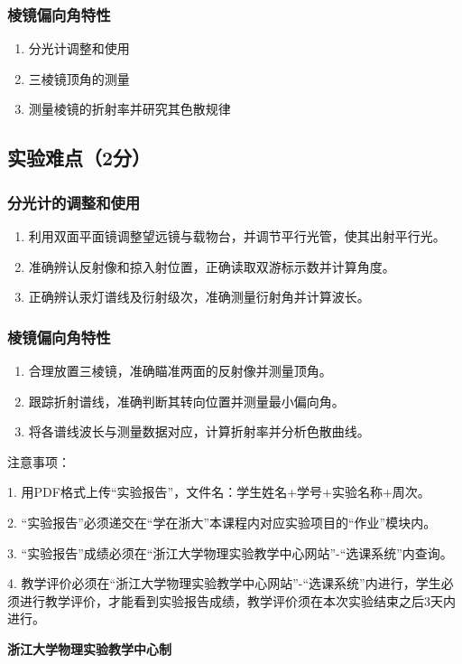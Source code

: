 \documentclass[10pt,a4paper]{ctexart} %
\begin{document}
    \subsubsection{棱镜偏向角特性}
    \begin{enumerate}
      \item 分光计调整和使用
      \item 三棱镜顶角的测量
      \item 测量棱镜的折射率并研究其色散规律
    \end{enumerate}

  \subsection{实验难点（2分）}

    \subsubsection{分光计的调整和使用}
    \begin{enumerate}
      \item 利用双面平面镜调整望远镜与载物台，并调节平行光管，使其出射平行光。
      \item 准确辨认反射像和掠入射位置，正确读取双游标示数并计算角度。
      \item 正确辨认汞灯谱线及衍射级次，准确测量衍射角并计算波长。
    \end{enumerate}

    \subsubsection{棱镜偏向角特性}
    \begin{enumerate}
      \item 合理放置三棱镜，准确瞄准两面的反射像并测量顶角。
      \item 跟踪折射谱线，准确判断其转向位置并测量最小偏向角。
      \item 将各谱线波长与测量数据对应，计算折射率并分析色散曲线。
    \end{enumerate}

\vspace*{\fill} %
\noindent
\begin{minipage}{\textwidth}
  注意事项：

  \begingroup
    \setlength{\leftskip}{2em} %
    1. 用PDF格式上传“实验报告”，文件名：学生姓名+学号+实验名称+周次。

    2. “实验报告”必须递交在“学在浙大”本课程内对应实验项目的“作业”模块内。

    3. “实验报告”成绩必须在“浙江大学物理实验教学中心网站”-“选课系统”内查询。

    4. 教学评价必须在“浙江大学物理实验教学中心网站”-“选课系统”内进行，学生必须进行教学评价，才能看到实验报告成绩，教学评价须在本次实验结束之后3天内进行。\par
  \endgroup

  \begin{center}
    {\bfseries 浙江大学物理实验教学中心制}
  \end{center}
\end{minipage}
\end{document}

